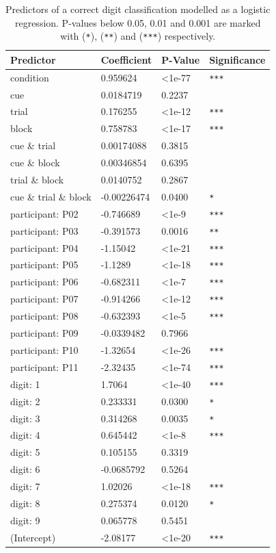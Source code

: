 \documentclass[a4paper,11pt,openany]{book}
\begin{document}
\begin{table}[htbp]
\caption{\label{tab:orgc04280b}
Predictors of a correct digit classification modelled as a logistic regression. P-values below 0.05, 0.01 and 0.001 are marked with (\texttt{*}), (\texttt{**}) and (\texttt{***}) respectively.}
\centering
\scriptsize
\begin{tabu} to \textwidth {XXXl}
\hline
Predictor & Coefficient & P-Value & Significance\\
\hline
condition & 0.959624 & <1e-77 & \texttt{***}\\
\hline
cue & 0.0184719 & 0.2237 & \\
trial & 0.176255 & <1e-12 & \texttt{***}\\
block & 0.758783 & <1e-17 & \texttt{***}\\
cue \& trial & 0.00174088 & 0.3815 & \\
cue \& block & 0.00346854 & 0.6395 & \\
trial \& block & 0.0140752 & 0.2867 & \\
cue \& trial \& block & -0.00226474 & 0.0400 & \texttt{*}\\
\hline
participant: P02 & -0.746689 & <1e-9 & \texttt{***}\\
participant: P03 & -0.391573 & 0.0016 & \texttt{**}\\
participant: P04 & -1.15042 & <1e-21 & \texttt{***}\\
participant: P05 & -1.1289 & <1e-18 & \texttt{***}\\
participant: P06 & -0.682311 & <1e-7 & \texttt{***}\\
participant: P07 & -0.914266 & <1e-12 & \texttt{***}\\
participant: P08 & -0.632393 & <1e-5 & \texttt{***}\\
participant: P09 & -0.0339482 & 0.7966 & \\
participant: P10 & -1.32654 & <1e-26 & \texttt{***}\\
participant: P11 & -2.32435 & <1e-74 & \texttt{***}\\
\hline
digit: 1 & 1.7064 & <1e-40 & \texttt{***}\\
digit: 2 & 0.233331 & 0.0300 & \texttt{*}\\
digit: 3 & 0.314268 & 0.0035 & \texttt{*}\\
digit: 4 & 0.645442 & <1e-8 & \texttt{***}\\
digit: 5 & 0.105155 & 0.3319 & \\
digit: 6 & -0.0685792 & 0.5264 & \\
digit: 7 & 1.02026 & <1e-18 & \texttt{***}\\
digit: 8 & 0.275374 & 0.0120 & \texttt{*}\\
digit: 9 & 0.065778 & 0.5451 & \\
\hline
(Intercept) & -2.08177 & <1e-20 & \texttt{***}\\
\hline
\end{tabu}
\end{table}
\end{document}
